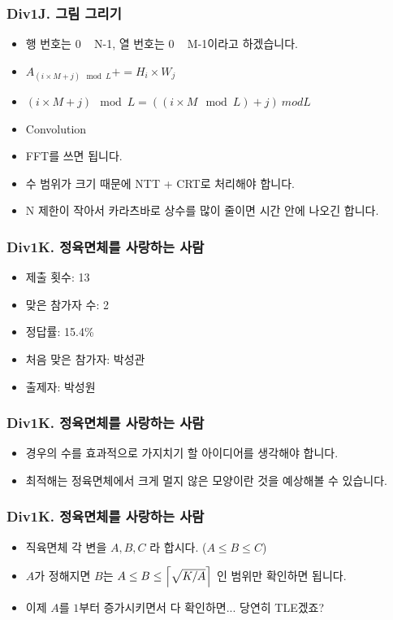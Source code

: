 \documentclass[xetex]{beamer}
\DeclarePairedDelimiter\ceil{\lceil}{\rceil}
\begin{document}
\begin{frame}
  \frametitle{Div1J. 그림 그리기}
  \begin{itemize}
    \item 행 번호는 0 ~ N-1, 열 번호는 0 ~ M-1이라고 하겠습니다.
    \item $A_{(i \times M + j) \mod L} += H_i \times W_j$
    \item $(i \times M + j) \mod L = ((i \times M \mod L) + j) \ mod L$
    \item Convolution
    \item FFT를 쓰면 됩니다.
    \item 수 범위가 크기 때문에 NTT + CRT로 처리해야 합니다.
    \item N 제한이 작아서 카라츠바로 상수를 많이 줄이면 시간 안에 나오긴 합니다.
  \end{itemize}
\end{frame}

\begin{frame}
  \frametitle{Div1K. 정육면체를 사랑하는 사람}
  \begin{itemize}
    \item 제출 횟수: 13
    \item 맞은 참가자 수: 2
    \item 정답률: 15.4\%
    \item 처음 맞은 참가자: 박성관
    \item 출제자: 박성원
  \end{itemize}
\end{frame}

\begin{frame}
  \frametitle{Div1K. 정육면체를 사랑하는 사람}
  \begin{itemize}
    \item 경우의 수를 효과적으로 가지치기 할 아이디어를 생각해야 합니다.
    \item 최적해는 정육면체에서 크게 멀지 않은 모양이란 것을 예상해볼 수 있습니다.
  \end{itemize}
\end{frame}

\begin{frame}
  \frametitle{Div1K. 정육면체를 사랑하는 사람}
  \begin{itemize}
    \item 직육면체 각 변을 $A, B, C$ 라 합시다. ($A \le B \le C$)
    \item $A$가 정해지면 $B$는  $A \le B \le \ceil*{\sqrt{K/A}}$ 인 범위만 확인하면 됩니다.
    \item 이제 $A$를 $1$부터 증가시키면서 다 확인하면... 당연히 TLE겠죠?
  \end{itemize}
\end{frame}
\end{document}
